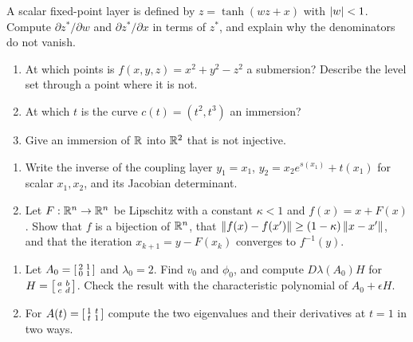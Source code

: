 \begin{notechapter}
\begin{exercise}\label{inverse-implicit:exr:7}
A scalar fixed-point layer is defined by $z = \tanh(wz + x)$ with
$\left|w\right| < 1$. Compute $\partial z^*/\partial w$ and
$\partial z^*/\partial x$ in terms of $z^*$, and explain why the
denominators do not vanish.
\end{exercise}

\begin{exercise}\label{inverse-implicit:exr:8}
\begin{enumerate}[nosep]
  \item At which points is $f(x, y, z) = x^2 + y^2 - z^2$ a submersion?
        Describe the level set through a point where it is not.
  \item At which $t$ is the curve $c(t) = (t^2, t^3)$ an immersion?
  \item Give an immersion of $\mathbb{R}$ into $\mathbb{R}^2$ that is not injective.
\end{enumerate}
\end{exercise}

\begin{exercise}\label{inverse-implicit:exr:9}
\begin{enumerate}[nosep]
  \item Write the inverse of the coupling layer
        $y_1 = x_1$, $y_2 = x_2e^{s(x_1)} + t(x_1)$ for scalar $x_1, x_2$,
        and its Jacobian determinant.
  \item Let $F:\mathbb{R}^n\to\mathbb{R}^n$ be Lipschitz with a constant $\kappa < 1$ and
        $f(x) = x + F(x)$. Show that $f$ is a bijection of $\mathbb{R}^n$, that
        $\left\|f(x) - f(x')\right\|\geq(1 - \kappa)\left\|x - x'\right\|$, and that the
        iteration $x_{k+1} = y - F(x_k)$ converges to $f^{-1}(y)$.
\end{enumerate}
\end{exercise}

\begin{exercise}\label{inverse-implicit:exr:10}
\begin{enumerate}[nosep]
  \item Let $A_0 = \begin{bsmallmatrix}2 & 1\\ 0 & 1\end{bsmallmatrix}$
        and $\lambda_0 = 2$. Find $v_0$ and $\phi_0$, and compute
        $D\lambda(A_0)H$ for
        $H = \begin{bsmallmatrix}a & b\\ c & d\end{bsmallmatrix}$.
        Check the result with the characteristic polynomial of
        $A_0 + \epsilon H$.
  \item For
        $A(t) = \begin{bsmallmatrix}1 & t\\ t & 1\end{bsmallmatrix}$
        compute the two eigenvalues and their derivatives at $t = 1$
        in two ways.
\end{enumerate}
\end{exercise}
\end{notechapter}
